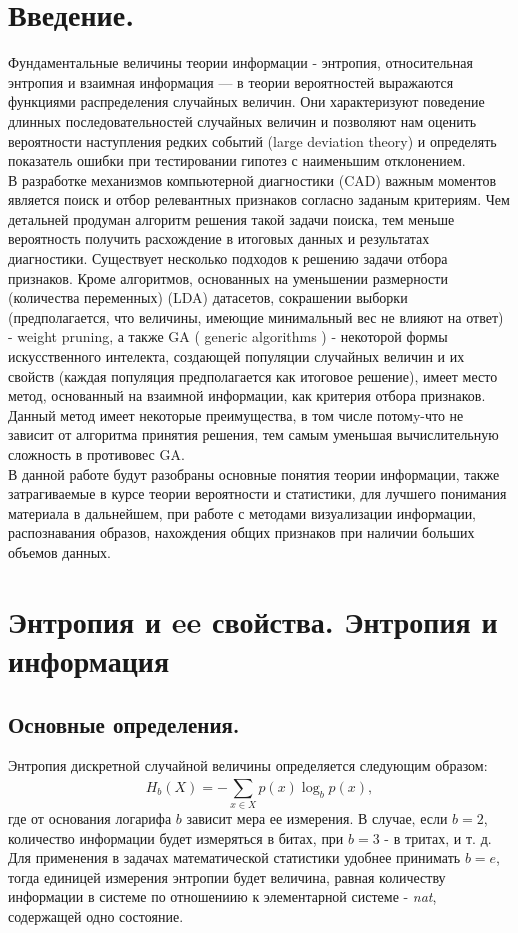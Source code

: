 \documentclass[12pt,a4paper]{scrartcl}
\begin{document}
	
	\tableofcontents
	\pagebreak
	\section{Введение.}
	Фундаментальные величины теории информации  - энтропия, относительная энтропия и взаимная информация — в теории вероятностей выражаются функциями распределения случайных величин. Они характеризуют поведение длинных последовательностей случайных величин и позволяют нам оценить вероятности наступления редких событий (large deviation theory) и определять показатель ошибки при тестировании гипотез с наименьшим отклонением.\\
	В разработке механизмов компьютерной диагностики (CAD) важным моментов является поиск и отбор релевантных признаков согласно заданым критериям. Чем детальней продуман алгоритм решения такой задачи поиска, тем меньше вероятность получить расхождение в итоговых данных и результатах диагностики.
	Существует несколько подходов к решению задачи отбора признаков. Кроме алгоритмов, основанных на уменьшении размерности (количества переменных) (LDA) датасетов, сокрашении выборки (предполагается, что величины, имеющие минимальный вес не влияют на ответ) - weight pruning, а также GA ( generic algorithms ) - некоторой формы искусственного интелекта, создающей популяции случайных величин и их свойств (каждая популяция предполагается как итоговое решение), имеет место метод, основанный на взаимной информации, как критерия отбора признаков. Данный метод имеет некоторые преимущества, в том числе потомy-что не зависит от алгоритма принятия решения, тем самым уменьшая вычислительную сложность в противовес GA.\\
	В данной работе будут разобраны основные понятия теории информации, также затрагиваемые в курсе теории вероятности и статистики, для лучшего понимания материала в дальнейшем, при работе с методами визуализации информации, распознавания образов, нахождения общих признаков при наличии больших объемов данных.
	\pagebreak
	\section{Энтропия и ee свойства. Энтропия и информация}
	\subsection{Основные определения.}
	Энтропия дискретной случайной величины определяется следующим образом:
	\begin{equation}
	H_b(X) = -\sum_{x \in X}^{} p(x) \log_{b}{p(x)},
	\end{equation}
	где от основания логарифа $b$ зависит мера ее измерения.
	В случае, если $b = 2$, количество информации будет измеряться в битах, при $b = 3$ - в тритах, и т. д. Для применения в задачах математической статистики удобнее принимать $b = e$, тогда единицей измерения энтропии будет величина, равная количеству информации в системе по отношениию к элементарной системе - {\itshape nat\/}, содержащей одно состояние.
	
\end{document}
